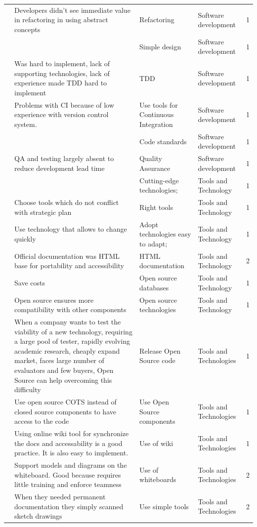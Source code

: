 \documentclass[final,5p,times,twocolumn]{elsarticle}
\begin{document}
\begin{center}
\begin{longtable}{|p{0.4in}|p{3in}|p{1.3in}|p{1in}|p{0.3in}|}
\cite{Silva2005} & Developers didn't see immediate value in refactoring in using abstract concepts & Refactoring & Software development & 1 \\
\cite{Silva2005} &       & Simple design & Software development & 1 \\
\cite{Silva2005} & Was hard to implement, lack of supporting technologies, lack of experience made TDD hard to implement & TDD   & Software development & 1 \\
\cite{Silva2005} & Problems with CI because of low experience with version control system. & Use tools for Continuous Integration & Software development & 1 \\
\cite{Silva2005} &       & Code standards & Software development & 1 \\
\cite{Camel1994a} & QA and testing largely absent to reduce development lead time & Quality Assurance & Software development & 1 \\
\cite{Silva2005} &       & Cutting-edge technologies; & Tools and Technology & 1 \\
\cite{Crowne2002} & Choose tools which do not conflict with strategic plan & Right tools & Tools and Technology & 1 \\
\cite{Sutton2000} & Use technology that allows to change quickly & Adopt technologies easy to adapt; & Tools and Technology & 1 \\
\cite{Ambler2002} & Official documentation was HTML base for portability and accessibility & HTML documentation & Tools and Technology & 2 \\
\cite{Wall2001} & Save costs & Open source databases & Tools and Technology & 1 \\
\cite{Wall2001} & Open source ensures more compatibility with other components & Open source technologies & Tools and Technology & 1 \\
\cite{Wood2005} & When a company wants to test the viability of a new technology, requiring a large pool of tester, rapidly evolving academic research, cheaply expand market, faces large number of evaluators and few buyers, Open Source can help overcoming this difficulty & Release Open Source code & Tools and Technologies & 1 \\
\cite{Wood2005} & Use open source COTS  instead of closed source components to have access to the code & Use Open Source components & Tools and Technologies & 1 \\
\cite{Bean2005} & Using online wiki tool for synchronize the docs and accessability is a good practice. It is also easy to implement. & Use of wiki & Tools and Technologies & 1 \\
\cite{Ambler2002} & Support models and diagrams on the whiteboard. Good because requires little training and enforce teamness & Use of whiteboards & Tools and Technologies & 2 \\
\cite{Ambler2002} & When they needed permanent documentation they simply scanned sketch drawings & Use simple tools & Tools and Technologies & 2 \\




\end{longtable}
\end{center}
\end{document}
